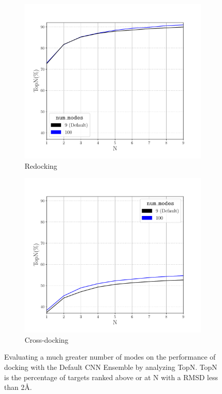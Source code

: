 \documentclass[journal=jcisd8,manuscript=article]{achemso}
\begin{document}
\begin{figure}    
        \begin{subfigure}[b]{0.48\textwidth}    
		\centering
		\includegraphics[width=\textwidth]{figures/redocking/sweep_num_modes_line.pdf}
		\caption{Redocking}
		\label{fig:num modes rd}
        \end{subfigure}    
        \begin{subfigure}[b]{0.48\textwidth}    
		\centering
		\includegraphics[width=\textwidth]{figures/crossdocking/sweep_num_modes_line.pdf}
		\caption{Cross-docking}
		\label{fig:num modes cd}
        \end{subfigure}    
	\caption{Evaluating a much greater number of modes on the performance of docking with the Default CNN Ensemble by analyzing TopN. TopN is the percentage of targets ranked above or at N with a RMSD less than 2{\AA}.}
	\label{fig:num modes}
\end{figure}
\end{document}

